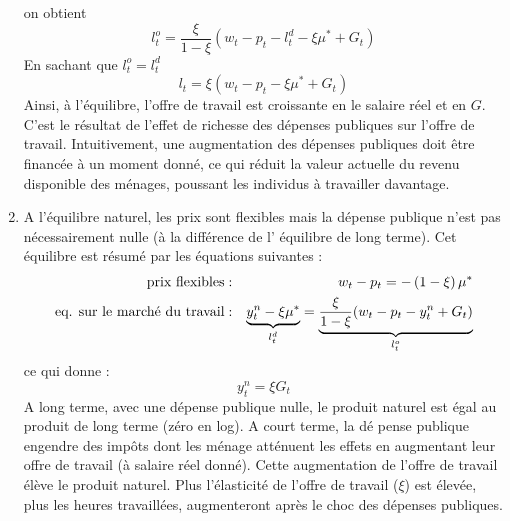 \documentclass[a4paper,11pt]{article}
\begin{document}
\begin{enumerate}
on obtient \begin{equation*}
l_{t}^{o}=\frac{\xi}{1-\xi}(w_{t}-p_{t}- l_t^d - \xi \mu ^{\ast }+G_t) 
\end{equation*}
En sachant que $l_t^o=l_t^d$ \begin{equation*}
l_{t}=\xi(w_{t}-p_{t}- \xi \mu ^{\ast }+G_t) 
\end{equation*}
Ainsi, à l'équilibre, l'offre de travail est croissante en le salaire réel et en $G$. C'est
le résultat de l'effet de richesse des dépenses publiques sur l'offre de travail. Intuitivement,
une augmentation des dépenses publiques doit être financée à un moment donné, ce qui réduit
la valeur actuelle du revenu disponible des ménages, poussant les individus à travailler davantage.

\item A l'\'{e}quilibre naturel, les prix sont flexibles mais la d\'{e}pense
publique n'est pas n\'{e}cessairement nulle (\`{a} la diff\'{e}rence de l'%
\'{e}quilibre de long terme). Cet \'{e}quilibre est r\'{e}sum\'{e} par les 
\'{e}quations suivantes :%
\begin{eqnarray*}
\text{prix flexibles} &:&w_{t}-p_{t}=-\left( 1-\xi \right) \mu ^{\ast } \\
\text{eq. sur le march\'{e} du travail} &:&\underset{l_{t}^{d}}{\underbrace{%
y_{t}^{n}-\xi \mu ^{\ast }}}=\underset{l_{t}^{o}}{\underbrace{\frac{\xi }{%
1-\xi }(w_{t}-p_{t}-y_{t}^{n}+G_{t})}}
\end{eqnarray*}%
ce qui donne :%
\begin{equation*}
y_{t}^{n}=\xi G_{t}
\end{equation*}%
A long terme, avec une d\'{e}pense publique nulle, le produit naturel est 
\'{e}gal au produit de long terme (z\'{e}ro en log). A court terme, la d\'{e}%
pense publique engendre des imp\^{o}ts dont les m\'{e}nage att\'{e}nuent les
effets en augmentant leur offre de travail (\`{a} salaire r\'{e}el donn\'{e}).
Cette augmentation de l'offre de travail élève le produit naturel. Plus l'élasticité de l'offre 
de travail ($\xi$) est élevée, plus les heures travaillées, augmenteront après le choc
des dépenses publiques.



\end{enumerate}
\end{document}
